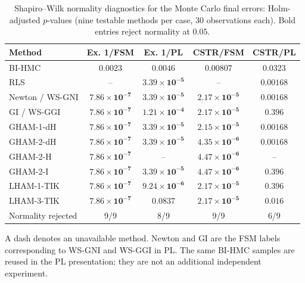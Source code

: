 \begin{table}[!htbp]
\centering
\small
\caption{Shapiro--Wilk normality diagnostics for the Monte Carlo final errors: Holm-adjusted $p$-values (nine testable methods per case, 30 observations each). Bold entries reject normality at $0.05$.}
\label{tab:expstats_normality}
\setlength{\tabcolsep}{5pt}
\renewcommand{\arraystretch}{1.12}
\begin{tabular}{@{}lcccc@{}}
\toprule
Method & Ex. 1/FSM & Ex. 1/PL & CSTR/FSM & CSTR/PL \\
\midrule
BI-HMC & $\mathbf{0.0023}$ & $\mathbf{0.0046}$ & $\mathbf{0.00807}$ & $\mathbf{0.0323}$ \\
RLS & -- & $\mathbf{3.39\times10^{-5}}$ & -- & $\mathbf{0.00168}$ \\
Newton / WS-GNI & $\mathbf{7.86\times10^{-7}}$ & $\mathbf{3.39\times10^{-5}}$ & $\mathbf{2.17\times10^{-5}}$ & $\mathbf{0.00168}$ \\
GI / WS-GGI & $\mathbf{7.86\times10^{-7}}$ & $\mathbf{1.21\times10^{-4}}$ & $\mathbf{2.17\times10^{-5}}$ & $0.396$ \\
GHAM-1-dH & $\mathbf{7.86\times10^{-7}}$ & $\mathbf{3.39\times10^{-5}}$ & $\mathbf{2.15\times10^{-5}}$ & $\mathbf{0.00168}$ \\
GHAM-2-dH & $\mathbf{7.86\times10^{-7}}$ & $\mathbf{3.39\times10^{-5}}$ & $\mathbf{4.35\times10^{-6}}$ & $\mathbf{0.00168}$ \\
GHAM-2-H & $\mathbf{7.86\times10^{-7}}$ & -- & $\mathbf{4.47\times10^{-6}}$ & -- \\
GHAM-2-I & $\mathbf{7.86\times10^{-7}}$ & $\mathbf{3.39\times10^{-5}}$ & $\mathbf{4.47\times10^{-6}}$ & $0.396$ \\
LHAM-1-TIK & $\mathbf{7.86\times10^{-7}}$ & $\mathbf{9.24\times10^{-6}}$ & $\mathbf{2.17\times10^{-5}}$ & $0.396$ \\
LHAM-3-TIK & $\mathbf{7.86\times10^{-7}}$ & $0.0837$ & $\mathbf{2.17\times10^{-5}}$ & $\mathbf{0.016}$ \\
Normality rejected & 9/9 & 8/9 & 9/9 & 6/9 \\
\bottomrule
\end{tabular}
\par\smallskip
\begin{minipage}{\linewidth}\footnotesize
A dash denotes an unavailable method. Newton and GI are the FSM labels corresponding to WS-GNI and WS-GGI in PL. The same BI-HMC samples are reused in the PL presentation; they are not an additional independent experiment.
\end{minipage}
\end{table}
